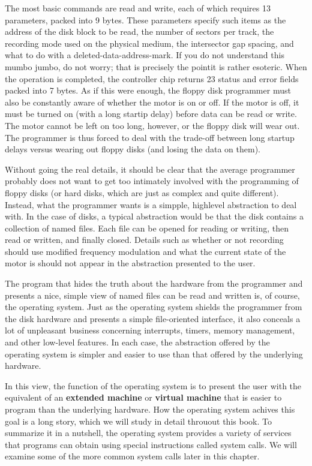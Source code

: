 \documentclass{book}
\newcommand {\kw}  [1] {\textbf{#1}}
\begin{document}
The most basic commands are read and write, each of which requires 13 parameters, packed into 9 bytes.
These parameters specify such items as the address of the disk block to be read, the number of sectors per track, 
the recording mode used on the physical medium, the intersector gap spacing, and what to do with a deleted-data-address-mark.
If you do not understand this mumbo jumbo, do not worry; that is precisely the pointit is rather esoteric.
When the operation is completed, the controller chip returns 23 status and error fields packed into 7 bytes.
As if this were enough, the floppy disk programmer must also be constantly aware of whether the motor is on or off.
If the motor is off, it must be turned on (with a long startip delay) before data can be read or write.
The motor cannot be left on too long, however, or the floppy disk will wear out.
The programmer is thus forced to deal with the trade-off between long startup delays versus wearing out floppy disks (and losing the data on them).

Without going the real details, it should be clear that the average programmer probably does not want to 
get too intimately involved with the programming of floppy disks (or hard disks, which are just as complex and quite different).
Instead, what the programmer wants is a simpple, highlevel abstraction to deal with.
In the case of disks, a typical abstraction would be that the disk contains a collection of named files.
Each file can be opened for reading or writing, then read or written, and finally closed.
Details such as whether or not recording should use modified frequency modulation and 
what the current state of the motor is should not appear in the abstraction presented to the user.

The program that hides the truth about the hardware from the programmer and 
presents a nice, simple view of named files can be read and written is, of course, the operating system.
Just as the operating system shields the programmer from the disk hardware and presents a simple file-oriented interface, 
it also conceals a lot of unpleasant business concerning interrupts, timers, memory management, and other low-level features.
In each case, the abstraction offered by the operating system is simpler and easier to use than that offered by the underlying hardware.

In this view, the function of the operating system is to present the user with the equivalent of an \kw{extended machine} or \kw{virtual machine} 
that is easier to program than the underlying hardware.
How the operating system achives this goal is a long story, which we will study in detail throuout this book.
To summarize it in a nutshell, the operating system provides a variety of services 
that programs can obtain using special instructions called system calls.
We will examine some of the more common system calls later in this chapter.
\end{document}
